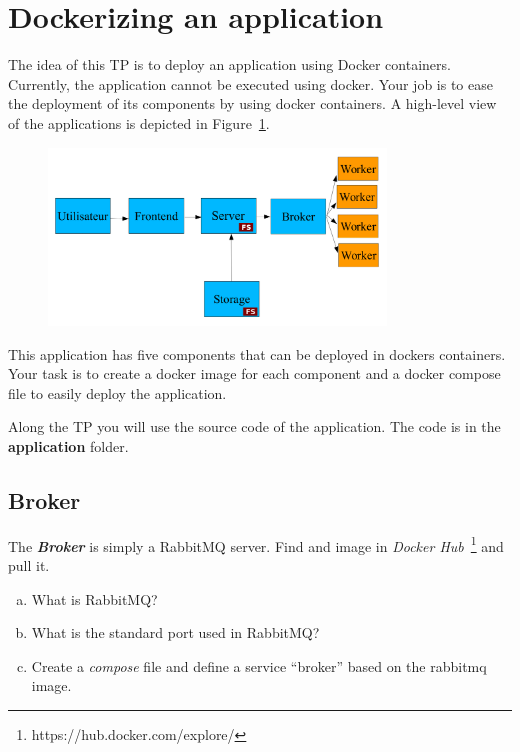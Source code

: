 \documentclass[a4paper,11pt]{exam}
\begin{document}
\section{Dockerizing an application}

The idea of this TP is to deploy an application using Docker containers.
Currently, the application cannot be executed using docker. Your job is to ease the deployment of its components by using docker containers.
A high-level view of the applications is depicted in Figure~\ref{fig:architecture}.

\begin{figure}[!ht]
	\centering
	\includegraphics[width=0.8\textwidth]{fig/architecture.png}
	\label{fig:architecture}
\end{figure}

This application has five components that can be deployed in dockers containers.
Your task is to create a docker image for each component and a docker compose file to easily deploy the application.

Along the TP you will use the source code of the application. The code is in the \textbf{application} folder.

\subsection{Broker}

\begin{questions}
	\question The \textit{\textbf{Broker}} is simply a RabbitMQ server. Find and image in \textit{Docker Hub}~\footnote{https://hub.docker.com/explore/} and pull it.
	\begin{enumerate}[(a)]
		\item What is RabbitMQ?
		\item What is the standard port used in RabbitMQ?
		\item Create a \textit{compose} file and define a service ``broker'' based on the rabbitmq image.
	\end{enumerate}
\end{questions}
\end{document}
